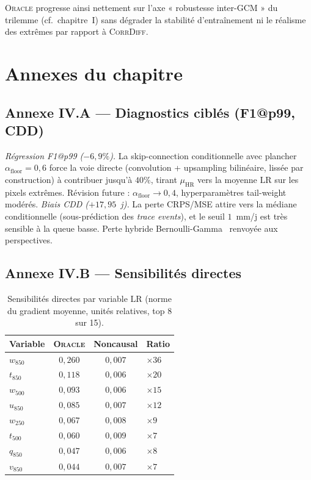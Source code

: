 \documentclass[14pt,a4paper,openany]{extreport}
\theoremstyle{definition}
\newcommand{\Oracle}{\textsc{Oracle}}
\newcommand{\CorrDiff}{\textsc{CorrDiff}}
\newcommand{\LR}{\ensuremath{\text{LR}}}
\newcommand{\HR}{\ensuremath{\text{HR}}}
\newcommand{\muHR}{\ensuremath{\mu_{\HR}}}
\begin{document}
\Oracle{} progresse ainsi nettement sur l'axe « robustesse inter-GCM » du trilemme (cf.~chapitre~I) sans dégrader la stabilité d'entraînement ni le réalisme des extrêmes par rapport à \CorrDiff{}.

\section*{Annexes du chapitre}

\subsection*{Annexe IV.A --- Diagnostics ciblés (F1@p99, CDD)}
\label{ssec:exp-annexe-diags}

\emph{Régression F1@p99 ($-6{,}9\%$).} La skip-connection conditionnelle avec plancher $\alpha_{\mathrm{floor}}=0{,}6$ force la voie directe (convolution + upsampling bilinéaire, lissée par construction) à contribuer jusqu'à $40\%$, tirant $\muHR$ vers la moyenne \LR{} sur les pixels extrêmes. Révision future : $\alpha_{\mathrm{floor}}\to 0{,}4$, hyperparamètres tail-weight modérés. \emph{Biais CDD ($+17{,}95$~j).} La perte CRPS/MSE attire vers la médiane conditionnelle (sous-prédiction des \emph{trace events}), et le seuil $1$~mm/j est très sensible à la queue basse. Perte hybride Bernoulli-Gamma~\cite{maraun_widmann_2018} renvoyée aux perspectives.

\subsection*{Annexe IV.B --- Sensibilités directes}
\label{ssec:exp-annexe-sens}

\begin{table}[ht]
  \centering
  \small
  \caption{Sensibilités directes par variable \LR{} (norme du gradient moyenne, unités relatives, top 8 sur 15).}
  \label{tab:exp-res-sens}
  \begin{tabularx}{\linewidth}{l c c X}
    \toprule
    \textbf{Variable} & \Oracle{} & \textbf{Noncausal} & \textbf{Ratio} \\
    \midrule
    $w_{850}$ & $0{,}260$ & $0{,}007$ & $\times 36$ \\
    $t_{850}$ & $0{,}118$ & $0{,}006$ & $\times 20$ \\
    $w_{500}$ & $0{,}093$ & $0{,}006$ & $\times 15$ \\
    $u_{850}$ & $0{,}085$ & $0{,}007$ & $\times 12$ \\
    $w_{250}$ & $0{,}067$ & $0{,}008$ & $\times 9$ \\
    $t_{500}$ & $0{,}060$ & $0{,}009$ & $\times 7$ \\
    $q_{850}$ & $0{,}047$ & $0{,}006$ & $\times 8$ \\
    $v_{850}$ & $0{,}044$ & $0{,}007$ & $\times 7$ \\
    \bottomrule
  \end{tabularx}
\end{table}
\end{document}
